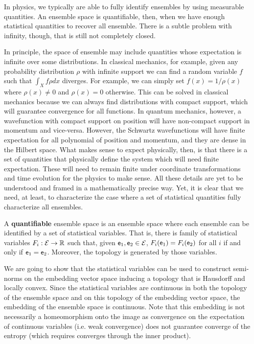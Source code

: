 In physics, we typically are able to fully identify ensembles by using measurable quantities. An ensemble space is quantifiable, then, when we have enough statistical quantities to recover all ensemble. There is a subtle problem with infinity, though, that is still not completely closed.

In principle, the space of ensemble may include quantities whose expectation is infinite over some distributions. In classical mechanics, for example, given any probability distribution $\rho$ with infinite support we can find a random variable $f$ such that $\int_X f \rho dx$ diverges. For example, we can simply set $f(x) = 1/\rho(x)$ where $\rho(x)\neq0$ and $\rho(x) = 0$ otherwise. This can be solved in classical mechanics because we can always find distributions with compact support, which will guarantee convergence for all functions. In quantum mechanics, however, a wavefunction with compact support on position will have non-compact support in momentum and vice-versa. However, the Schwartz wavefunctions will have finite expectation for all polynomial of position and momentum, and they are dense in the Hilbert space. What makes sense to expect physically, then, is that there is a set of quantities that physically define the system which will need finite expectation. These will need to remain finite under coordinate transformations and time evolution for the physics to make sense. All these details are yet to be understood and framed in a mathematically precise way. Yet, it is clear that we need, at least, to characterize the case where a set of statistical quantities fully characterize all ensembles.

\begin{defn}
	A \textbf{quantifiable} ensemble space is an ensemble space where each ensemble can be identified by a set of statistical variables. That is, there is family of statistical variables $F_i : \mathcal{E} \to \mathbb{R}$ such that, given $\mathsf{e}_1, \mathsf{e}_2 \in \mathcal{E}$, $F_i(\mathsf{e}_1) = F_i(\mathsf{e}_2)$ for all $i$ if and only if $\mathsf{e}_1 = \mathsf{e}_2$. Moreover, the topology is generated by those variables.
\end{defn}

We are going to show that the statistical variables can be used to construct semi-norms on the embedding vector space inducing a topology that is Hausdorff and locally convex. Since the statistical variables are continuous in both the topology of the ensemble space and on this topology of the embedding vector space, the embedding of the ensemble space is continuous. Note that this embedding is not necessarily a homeomorphism onto the image as convergence on the expectation of continuous variables (i.e. weak convergence) does not guarantee converge of the entropy (which requires converges through the inner product).

